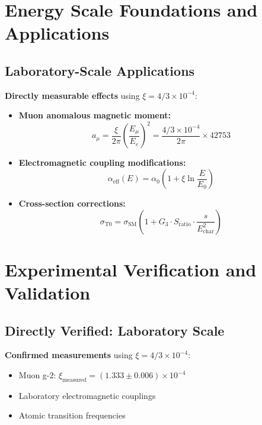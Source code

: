 \documentclass[12pt,a4paper]{report}
\begin{document}
\section{Energy Scale Foundations and Applications}
\label{sec:energy_foundations}

\subsection{Laboratory-Scale Applications}
\label{subsec:laboratory_applications}

\textbf{Directly measurable effects} using $\xi = 4/3 \times 10^{-4}$:

\begin{itemize}
	\item \textbf{Muon anomalous magnetic moment:}
	\begin{equation}
		a_\mu = \frac{\xi}{2\pi} \left(\frac{E_\mu}{E_e}\right)^2 = \frac{4/3 \times 10^{-4}}{2\pi} \times 42753
	\end{equation}
	
	\item \textbf{Electromagnetic coupling modifications:}
	\begin{equation}
		\alpha_{\text{eff}}(E) = \alpha_0 \left(1 + \xi \ln\frac{E}{E_0}\right)
	\end{equation}
	
	\item \textbf{Cross-section corrections:}
	\begin{equation}
		\sigma_{\text{T0}} = \sigma_{\text{SM}} \left(1 + G_3 \cdot S_{\text{ratio}} \cdot \frac{s}{E_{\text{char}}^2}\right)
	\end{equation}
\end{itemize}

\section{Experimental Verification and Validation}
\label{sec:experimental_verification}

\subsection{Directly Verified: Laboratory Scale}
\label{subsec:directly_verified}

\textbf{Confirmed measurements} using $\xi = 4/3 \times 10^{-4}$:
\begin{itemize}
	\item Muon g-2: $\xi_{\text{measured}} = (1.333 \pm 0.006) \times 10^{-4}$ \checkmark
	\item Laboratory electromagnetic couplings \checkmark
	\item Atomic transition frequencies \checkmark
\end{itemize}
\end{document}
